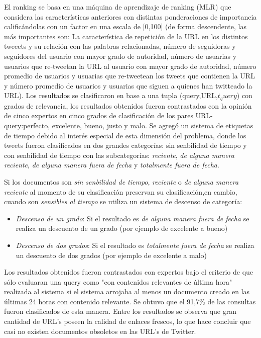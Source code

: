 	El ranking se basa en una máquina de aprendizaje de ranking (MLR) que considera las características anteriores con distintas ponderaciones de importancia calificándolas con un factor en una escala de [0,100] (de forma descendente, las más importantes son: La característica de repetición de la URL en los distintos tweeets y su relación con las palabras relacionadas, número de seguidoras y seguidores del usuario con mayor grado de autoridad, número de usuarias y usuarios que re-tweetan la URL al usuario con mayor grado de autoridad, número promedio de usuarios y usuarias que re-tweetean los tweets que contienen la URL y número promedio de usuarios y usuarias que siguen a quienes han twitteado la URL). Los resultados se clasificaron en base a una tupla (query,URL,$t_query$) con grados de relevancia, los resultados obtenidos fueron contrastados con la opinión de cinco expertos en cinco grados de clasificación de los pares URL-query:perfecto, excelente, bueno, justo y malo. Se agregó un sistema de etiquetas de tiempo debido al interés especial de esta dimensión del problema, donde los tweets fueron clasificados en dos grandes categorías: sin senbilidad de tiempo y con senbilidad de tiempo con las subcategorías: \emph{reciente}, \emph{de alguna manera reciente}, \emph{de alguna manera fuera de fecha} y \emph{totalmente fuera de fecha}.
	
	
	Si los documentos son \emph{sin senbilidad de tiempo}, \emph{reciente} o \emph{de alguna manera reciente} al momento de su clasificación preservan su clasificación,en cambio, cuando son \emph{sensibles al tiempo} se utiliza un sistema de descenso de categoría:
	
	\begin{itemize}
		\item \emph{Descenso de un grado}: Si el resultado es \emph{de alguna manera fuera de fecha} se realiza un descuento de un grado (por ejemplo de excelente a bueno)
		\item \emph{Descenso de dos grados}: Si el resultado es \emph{totalmente fuera de fecha} se realiza un descuento de dos grados (por ejemplo de excelente a malo)
	\end{itemize}
	
	Los resultados obtenidos fueron contrastados con expertos bajo el criterio de que sólo evaluaran una query como "con contenidos relevantes de última hora" realizada al sistema si el sistema arrojaba al menos un documento creado en las últimas 24 horas con contenido relevante. Se obtuvo que el 91,7\% de las consultas fueron clasificados de esta manera. Entre los resultados se observa que gran cantidad de URL's poseen la calidad de enlaces frescos, lo que hace concluir que casi no existen documentos obsoletos en las URL's de Twitter. 
	
